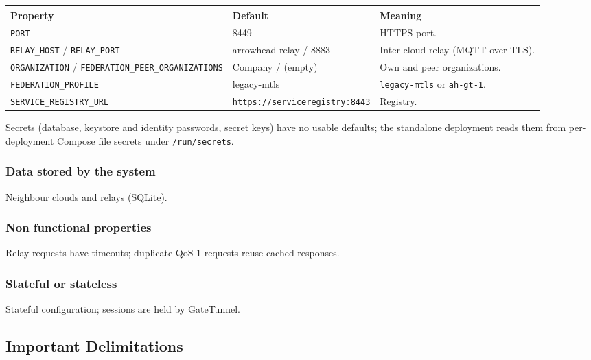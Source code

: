 \documentclass[a4paper]{arrowhead}
\begin{document}
\noindent\begin{longtable}{| p{5.4cm} | p{3.4cm} | p{6.4cm} |} \hline
\rowcolor{gray!33} Property & Default & Meaning \\ \hline \endhead
\texttt{PORT} & 8449 & HTTPS port. \\ \hline
\texttt{RELAY\_\allowbreak{}HOST} / \texttt{RELAY\_\allowbreak{}PORT} & arrowhead-relay / 8883 & Inter-cloud relay (MQTT over TLS). \\ \hline
\texttt{ORGANIZATION} / \texttt{FEDERATION\_\allowbreak{}PEER\_\allowbreak{}ORGANIZATIONS} & Company / (empty) & Own and peer organizations. \\ \hline
\texttt{FEDERATION\_\allowbreak{}PROFILE} & legacy-mtls & \texttt{legacy-\allowbreak{}mtls} or \texttt{ah-\allowbreak{}gt-\allowbreak{}1}. \\ \hline
\texttt{SERVICE\_\allowbreak{}REGISTRY\_\allowbreak{}URL} & \texttt{https:\allowbreak{}/\allowbreak{}/\allowbreak{}serviceregistry:\allowbreak{}8443} & Registry. \\ \hline
\end{longtable}

Secrets (database, keystore and identity passwords, secret keys) have no usable defaults; the standalone deployment reads them from per-deployment Compose file secrets under \texttt{/\allowbreak{}run/\allowbreak{}secrets}.

\subsubsection{Data stored by the system}

Neighbour clouds and relays (SQLite).

\subsubsection{Non functional properties}

Relay requests have timeouts; duplicate QoS 1 requests reuse cached responses.

\subsubsection{Stateful or stateless}

Stateful configuration; sessions are held by GateTunnel.

\subsection{Important Delimitations}
\label{sec:delimitations}
\end{document}
